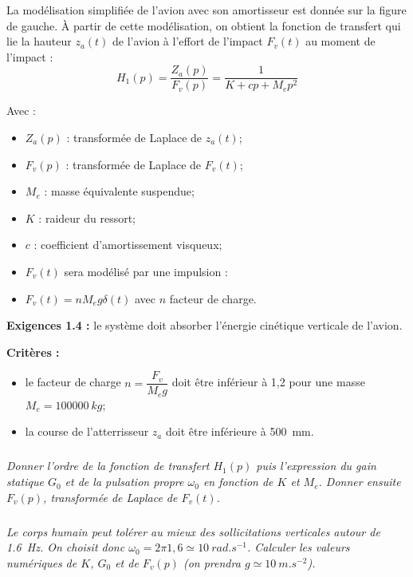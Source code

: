 \documentclass[10pt,fleqn]{article} %
\begin{document}
\begin{multicols}{2}
La modélisation simplifiée de l'avion avec son
amortisseur est donnée sur la figure de gauche. À partir
de cette modélisation, on obtient la fonction de
transfert qui lie la hauteur $z_a(t)$ de l'avion à l’effort de
l’impact $F_v(t)$ au moment de l’impact :
$$
H_1(p)=\dfrac{Z_a(p)}{F_v(p)}=\dfrac{1}{K+cp+M_e p^2}
$$

Avec : 
\begin{itemize}
\item $Z_a(p)$ : transformée de Laplace de $z_a(t)$;
\item $F_v(p)$ : transformée de Laplace de $F_v(t)$;
\item $M_e$ : masse équivalente suspendue;
\item $K$ : raideur du ressort;
\item $c$ : coefficient d’amortissement visqueux;
\item $F_v(t)$ sera modélisé par une impulsion :
\item $F_v(t)=n M_e g \delta (t)$ avec $n$ facteur de charge.
\end{itemize}


\textbf{Exigences 1.4  : } le système doit absorber l'énergie cinétique verticale de l'avion. 

\textbf{Critères : }
 \begin{itemize}
 \item le facteur de charge $n=\dfrac{F_v}{M_e g}$ doit être inférieur à 1,2 pour une masse $M_e = \SI{100000}{kg}$;
 \item la course de l'atterrisseur $z_a$ doit être inférieure à \SI{500}{mm}.
 \end{itemize}


\subparagraph{}
\textit{%
Donner l’ordre de la fonction
de transfert $H_1(p)$ puis l’expression du gain statique $G_0$ et de la pulsation propre $\omega_0$ en fonction de $K$ et $M_e$.
Donner ensuite $F_v(p)$, transformée de Laplace de $F_v(t)$.}
\ifprof
\begin{corrige}

\end{corrige}
\else
\fi



\subparagraph{}
\textit{Le corps humain peut tolérer au mieux des sollicitations verticales autour de \SI{1,6}{Hz}. On choisit donc $\omega_0 = 2\pi 1,6 \simeq \SI{10}{rad.s^{-1}}$. Calculer les valeurs numériques de $K$, $G_0$ et de $F_v(p)$ (on prendra $g \simeq \SI{10}{m.s^{-2}}$).}
\ifprof
\begin{corrige}
\end{corrige}
\else
\fi



\end{multicols}
\end{document}
